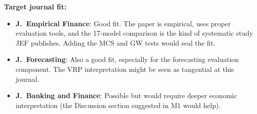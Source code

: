 \documentclass[12pt,a4paper]{article}
\begin{document}
\textbf{Target journal fit:}
\begin{itemize}
\item \textbf{J.\ Empirical Finance}: Good fit. The paper is empirical, uses proper evaluation tools, and the 17-model comparison is the kind of systematic study JEF publishes. Adding the MCS and GW tests would seal the fit.
\item \textbf{J.\ Forecasting}: Also a good fit, especially for the forecasting evaluation component. The VRP interpretation might be seen as tangential at this journal.
\item \textbf{J.\ Banking and Finance}: Possible but would require deeper economic interpretation (the Discussion section suggested in M1 would help).
\end{itemize}
\end{document}
